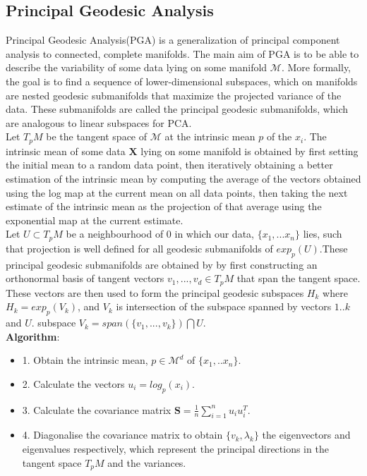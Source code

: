 \documentclass[12pt]{report}
\begin{document}
\newpage

\subsection{Principal Geodesic Analysis}

Principal Geodesic Analysis(PGA) is a generalization of 
principal component analysis to connected, 
complete manifolds. The main aim of PGA is to be able to 
describe the variability of some data lying on some manifold $\mathcal{M}$. 
More formally, the goal is to find a sequence of lower-dimensional subspaces, 
which on manifolds are nested geodesic submanifolds 
that maximize the projected variance of the data. 
These submanifolds are called the principal geodesic submanifolds, 
which are analogous to linear subspaces for PCA.\\
Let $T_pM$ be the tangent space of $\mathcal{M}$ at the intrinsic mean $p$ of the $x_i$. 
The intrinsic mean of some data $\textbf{X}$ lying on some manifold is obtained 
by first setting the initial mean to a random data point, 
then iteratively obtaining a better estimation of the intrinsic mean 
by computing the average of the vectors obtained using the log map at 
the current mean on all data points, then taking the next estimate of the 
intrinsic mean as the projection of that average using the exponential map 
at the current estimate.\\
Let $U \subset T_pM$ be a neighbourhood of 0 in which our data, 
$\{x_1,...x_n\}$ lies, such that projection is well defined 
for all geodesic submanifolds of $exp_p(U)$.These principal geodesic submanifolds 
are obtained by by first constructing an orthonormal basis of tangent vectors 
$v_1,...,v_d \in T_pM$ that span the tangent space. 
These vectors are then used to form the principal geodesic subspaces 
$H_k$ where $H_k = exp_p(V_k)$, and $V_k$ is intersection of the 
subspace spanned by vectors $1..k$ and $U$.
subspace $V_k = span(\{v_1,...,v_k\})\bigcap U$.\\
\textbf{Algorithm}:
\begin{itemize}
    \item 1. Obtain the intrinsic mean, $p \in \mathcal{M}^d$ of $\{x_1,..x_n\}$.
    \item 2. Calculate the vectors $u_i = log_p(x_i)$.
    \item 3. Calculate the covariance matrix $\textbf{S} = \frac{1}{n} \sum^n_{i=1} u_iu_i^T$.
    \item 4. Diagonalise the covariance matrix to obtain $\{v_k, \lambda_k\}$ 
    the eigenvectors and eigenvalues respectively, 
    which represent the principal directions in the tangent space $T_pM$ and the variances.
\end{itemize}
\end{document}
